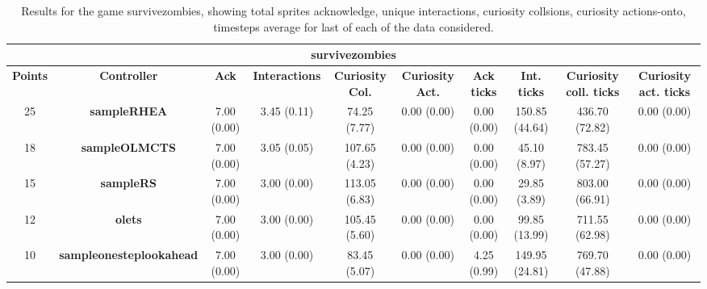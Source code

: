 \begin{table*}[!t]
\begin{center}
\begin{adjustbox}{width=1\textwidth}
\begin{tabular}{|c|c|c|c|c|c|c|c|c|c|}
\multicolumn{10}{c}{\textbf{survivezombies}}\\
\hline
\textbf{Points} & \textbf{Controller} & \textbf{Ack} & \textbf{Interactions} & \textbf{Curiosity Col.} & \textbf{Curiosity Act.} & \textbf{Ack ticks} & \textbf{Int. ticks} & \textbf{Curiosity coll. ticks} & \textbf{Curiosity act. ticks}\\
\hline
25 & \textbf{sampleRHEA} & 7.00 (0.00) & 3.45 (0.11) & 74.25 (7.77) & 0.00 (0.00) & 0.00 (0.00) & 150.85 (44.64) & 436.70 (72.82) & 0.00 (0.00)
 \\
\hline
18 & \textbf{sampleOLMCTS} & 7.00 (0.00) & 3.05 (0.05) & 107.65 (4.23) & 0.00 (0.00) & 0.00 (0.00) & 45.10 (8.97) & 783.45 (57.27) & 0.00 (0.00)
 \\
\hline
15 & \textbf{sampleRS} & 7.00 (0.00) & 3.00 (0.00) & 113.05 (6.83) & 0.00 (0.00) & 0.00 (0.00) & 29.85 (3.89) & 803.00 (66.91) & 0.00 (0.00)
 \\
\hline
12 & \textbf{olets} & 7.00 (0.00) & 3.00 (0.00) & 105.45 (5.60) & 0.00 (0.00) & 0.00 (0.00) & 99.85 (13.99) & 711.55 (62.98) & 0.00 (0.00)
 \\
\hline
10 & \textbf{sampleonesteplookahead} & 7.00 (0.00) & 3.00 (0.00) & 83.45 (5.07) & 0.00 (0.00) & 4.25 (0.99) & 149.95 (24.81) & 769.70 (47.88) & 0.00 (0.00)
 \\
\hline
\end{tabular}
\end{adjustbox}
\caption{Results for the game survivezombies, showing total sprites acknowledge, unique interactions, curiosity collsions, curiosity actions-onto, timesteps average for last of each of the data considered.}
\label{tab:weights}
\end{center}
\end{table*}
